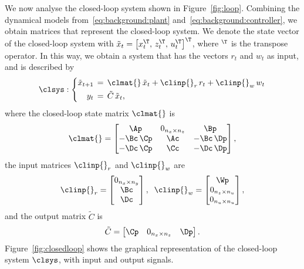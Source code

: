 We now analyse the closed-loop system shown in Figure~\ref{fig:loop}.
Combining the dynamical models from~\eqref{eq:background:plant} and~\eqref{eq:background:controller}, we obtain matrices that represent the closed-loop system.
We denote the state vector of the closed-loop system with $\tilde{x}_t = \left[ x_t^\T,\, z_t^\T,\, u_t^\T \right]^\T$, where $^\T$ is the transpose operator.
In this way, we obtain a system that has the vectors $r_t$ and $w_t$ as input, and is described by
%
\begin{equation} 
\label{eq:feedback-basic}
    \clsys : \left\{
    \begin{aligned}
        \tilde{x}_{t+1} &\,=\, \clmat{}\,\tilde{x}_{t} + \clinp{}_r\,r_{t} + \clinp{}_w\,w_{t}\\
        y_{t} &\,=\, \tilde C\,\tilde{x}_{t},
    \end{aligned} \right.
\end{equation}
%
where the closed-loop state matrix $\clmat{}$ is
%
\begin{equation}
\label{eq:matrixA}
    \clmat{} =
    \begin{bmatrix} \Ap       & 0_{n_x \times n_z} & \Bp \\
                    -\Bc\,\Cp & \Ac                                      & -\Bc\,\Dp \\
                    -\Dc\,\Cp & \Cc                                      & -\Dc\,\Dp
    \end{bmatrix},
\end{equation}
%
the input matrices $\clinp{}_r$ and $\clinp{}_w$ are
%
\begin{equation}
    \clinp{}_r = \begin{bmatrix} 0_{n_x \times n_y} \\ \Bc \\ \Dc \end{bmatrix},\;\;
    \clinp{}_w = \begin{bmatrix} \Wp \\ 0_{n_z \times n_u} \\ 0_{n_u \times n_u} \end{bmatrix},
\end{equation}
%
and the output matrix $\tilde C$ is
%
\begin{equation}
    \tilde C = \begin{bmatrix} \Cp & 0_{n_x \times n_z} & \Dp \end{bmatrix}.
\end{equation}
%
Figure~\ref{fig:closedloop} shows the graphical representation of the closed-loop system $\clsys$, with input and output signals.

